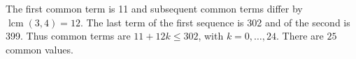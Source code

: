 The first common term is 11 and subsequent common terms differ by $\operatorname{lcm}(3,4)=12$. The last term of the first sequence is 302 and of the second is 399. Thus common terms are $11+12k\le302$, with $k=0,\ldots,24$. There are $\boxed{25}$ common values.
